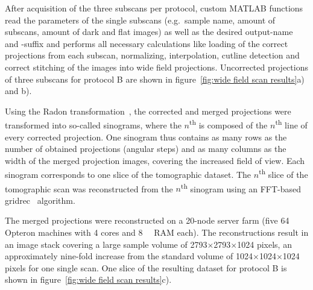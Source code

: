 After acquisition of the three subscans per protocol, custom MATLAB functions read the parameters of the single subscans (e.g.\ sample name, amount of subscans, amount of dark and flat images) as well as the desired output-name and -suffix and performs all necessary calculations like loading of the correct projections from each subscan, normalizing, interpolation, cutline detection and correct stitching of the images into wide field projections. Uncorrected projections of three subscans for protocol B are shown in figure~\ref{fig:wide field scan results}a) and b).%

Using the Radon transformation~\cite{Radon1917}, the corrected and merged projections were transformed into so-called sinograms, where the $n$\textsuperscript{th} is composed of the $n$\textsuperscript{th} line of every corrected projection. One sinogram thus contains as many rows as the number of obtained projections (angular steps) and as many columns as the width of the merged projection images, covering the increased field of view. Each sinogram corresponds to one slice of the tomographic dataset. The $n$\textsuperscript{th} slice of the tomographic scan was reconstructed from the $n$\textsuperscript{th} sinogram using an FFT-based gridrec~\cite{Dowd1999} algorithm.

The merged projections were reconstructed on a 20-node server farm (five \SI{64}{\bit} Opteron machines with 4 cores and \SI{8}{\giga\byte} RAM each). The reconstructions result in an image stack covering a large sample volume of 2793$\times$2793$\times$1024 pixels, an approximately nine-fold increase from the standard volume of 1024$\times$1024$\times$1024 pixels for one single scan. One slice of the resulting dataset for protocol B is shown in figure~\ref{fig:wide field scan results}c).